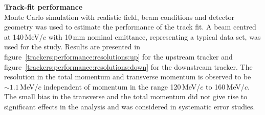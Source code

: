 \noindent\textbf{Track-fit performance} \\
\noindent
Monte Carlo simulation with realistic field, beam conditions and detector geometry was used to estimate the performance of the track fit.
A beam centred at 140\,MeV/$c$ with 10\,mm nominal emittance,
representing a typical data set, was used for the study.
Results are presented in
figure~\ref{trackers:performance:resolutions:up} for the upstream
tracker and figure~\ref{trackers:performance:resolutions:down} for the
downstream tracker.
The resolution in the total momentum and transverse momentum is
observed to be $\sim1.1$\,MeV/$c$ independent of momentum in the range
120\,MeV/$c$ to 160\,MeV/$c$.
The small bias in the transverse and the total momentum did not give rise to significant effects in the analysis and was considered in systematic error studies.
